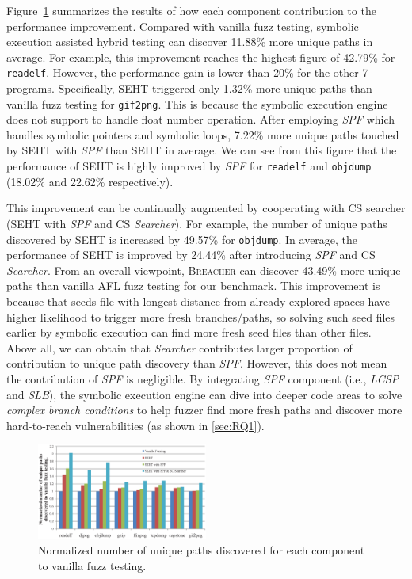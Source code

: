 \documentclass{cta-author}
\newcommand{\prototype}{\textsc{Breacher} }
\begin{document}
Figure~\ref{path-overall-rsults} summarizes the results of how each 
component contribution to the performance improvement. Compared with 
vanilla fuzz testing, symbolic execution assisted hybrid testing can 
discover 11.88\% more unique paths in average. For example, this 
improvement reaches the highest figure of 42.79\% for \texttt{readelf}. 
However, the performance gain is lower than 20\% for the other 7 programs. 
Specifically, SEHT triggered only 1.32\% more unique paths 
than vanilla fuzz testing for \texttt{gif2png}. This is because the 
symbolic execution engine does not support to handle float number 
operation. After employing \textit{SPF} which handles symbolic pointers 
and symbolic loops, 7.22\% more unique paths touched by SEHT with \textit{SPF}
than SEHT in average. We can see from this figure that 
the performance of SEHT is highly improved by \textit{SPF} 
for \texttt{readelf} and \texttt{objdump} (18.02\% and 22.62\% respectively).

This improvement can be continually augmented by cooperating with CS 
searcher (SEHT with \textit{SPF} and CS \textit{Searcher}). For example, the number 
of unique paths discovered by SEHT is increased by 
49.57\% for \texttt{objdump}. In average, the performance of SEHT 
is improved by 24.44\% after introducing \textit{SPF} and CS \textit{Searcher}. From an 
overall viewpoint, \prototype can discover 43.49\% more unique paths 
than vanilla AFL fuzz testing for our benchmark. This improvement is 
because that seeds file with longest distance from already-explored 
spaces have higher likelihood to trigger more fresh branches/paths, 
so solving such seed files earlier by symbolic execution can find more 
fresh seed files than other files. \\


Above all, we can obtain that \textit{Searcher} contributes larger 
proportion of contribution to unique path discovery than \textit{SPF}. 
However, this does not mean the contribution of \textit{SPF} is 
negligible. By integrating \textit{SPF} component (i.e., \textit{LCSP} 
and \textit{SLB}), the symbolic execution engine can dive into deeper 
code areas to solve \textit{complex branch conditions} to help fuzzer 
find more fresh paths and discover more hard-to-reach vulnerabilities
(as shown in \ref{sec:RQ1}).
		
		
\begin{figure}
	\begin{center}
		\includegraphics[width=0.5\textwidth]{path-discovery-SPF-CS-all.eps} 
		\caption{Normalized number of unique paths discovered for each component to vanilla fuzz testing.}\label{path-overall-rsults}
	\end{center}
\end{figure}
\end{document}
